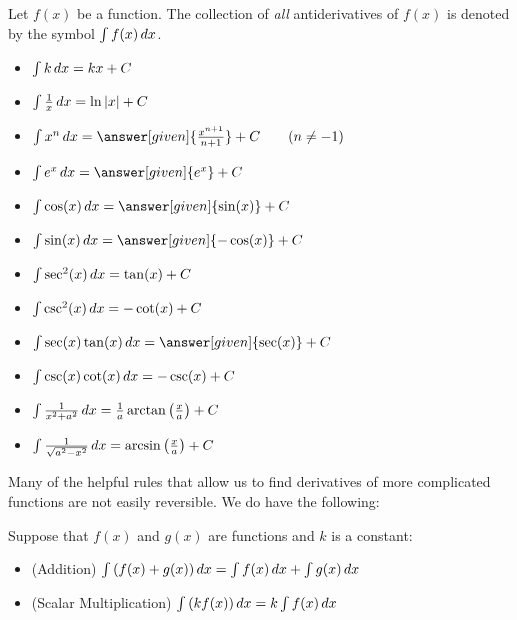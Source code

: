 \documentclass[nooutcomes]{ximera}
\begin{document}

\begin{definition}
Let $f(x)$ be a function.  The collection of \emph{all} antiderivatives of $f(x)$ is denoted by the symbol $\int f(x) \mathop{}\!d x$. 
\end{definition}


\begin{theorem}\hfil
\begin{itemize}
\item $\int k \mathop{}\!d x= k x+C$
\item $\int \frac{1}{x} \mathop{}\!d x= \ln|x|+C$
\item $\int x^n \d x= \answer[given]{\frac{x^{n+1}}{n+1}}+C\qquad(n\ne-1)$
\item $\int e^x \d x= \answer[given]{e^x} + C$
\item $\int \cos(x) \d x = \answer[given]{\sin(x)} + C$
\item $\int \sin(x) \d x = \answer[given]{-\cos(x)} + C$  
\item $\int \sec^2(x) \mathop{}\!d x =\tan(x) + C$
\item $\int \csc^2(x) \mathop{}\!d x = -\cot(x) + C$
\item $\int \sec(x)\tan(x) \d x = \answer[given]{\sec(x)} + C$
\item $\int \csc(x)\cot(x) \mathop{}\!d x = -\csc(x) + C$
\item $\int \frac{1}{x^2+a^2}\mathop{}\!d x = \frac{1}{a}\arctan\left(\frac{x}{a}\right) + C$
\item $\int \frac{1}{\sqrt{a^2-x^2}}\mathop{}\!d x= \arcsin\left(\frac{x}{a}\right)+C$
\end{itemize}
\end{theorem}


Many of the helpful rules that allow us to find derivatives of more complicated functions are not easily reversible.  We do have the following:

\begin{theorem} 
Suppose that $f(x)$ and $g(x)$ are functions and $k$ is a constant:
\begin{itemize}
\item (Addition) $\int \left(f(x) + g(x) \right) \mathop{}\!d x = \int f(x) \mathop{}\!d x+\int g(x)  \mathop{}\!d x$
\item (Scalar Multiplication) $\int \left(k f(x)\right) \mathop{}\!d x = k \int f(x) \mathop{}\!d x$
\end{itemize}
\end{theorem}
\end{document}
